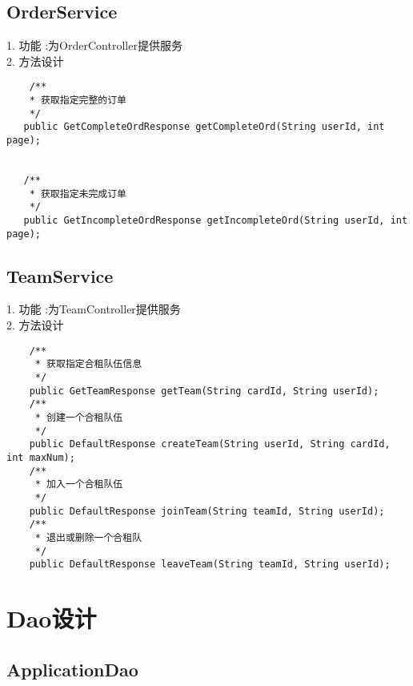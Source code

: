 \subsection{OrderService}
1. 功能 :为OrderController提供服务 \\
2. 方法设计
\begin{lstlisting}
    /**
    * 获取指定完整的订单
    */
   public GetCompleteOrdResponse getCompleteOrd(String userId, int page);


   /**
    * 获取指定未完成订单
    */
   public GetIncompleteOrdResponse getIncompleteOrd(String userId, int page);
\end{lstlisting}

\subsection{TeamService}
1. 功能 :为TeamController提供服务 \\
2. 方法设计
\begin{lstlisting}
    /**
     * 获取指定合租队伍信息
     */
    public GetTeamResponse getTeam(String cardId, String userId);
    /**
     * 创建一个合租队伍
     */
    public DefaultResponse createTeam(String userId, String cardId, int maxNum);
    /**
     * 加入一个合租队伍
     */
    public DefaultResponse joinTeam(String teamId, String userId);
    /**
     * 退出或删除一个合租队
     */
    public DefaultResponse leaveTeam(String teamId, String userId);
\end{lstlisting}

\section{Dao设计}

\subsection{ApplicationDao}

